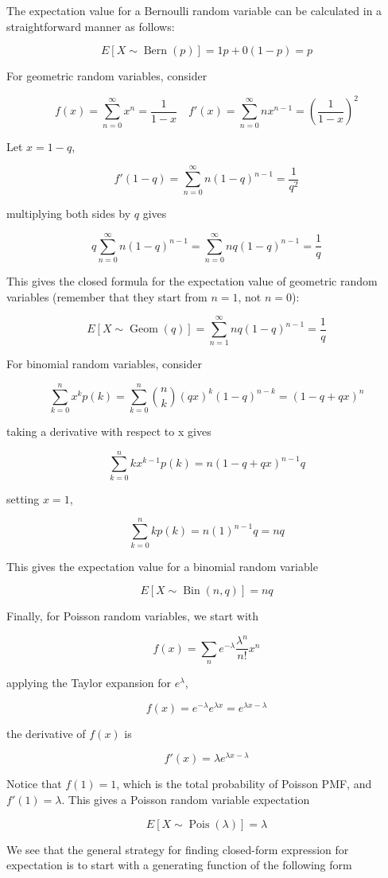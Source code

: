 \documentclass[12pt, a4paper]{article}
\newcommand{\Bern}{\operatorname{Bern}}
\newcommand{\Geom}{\operatorname{Geom}}
\newcommand{\Pois}{\operatorname{Pois}}
\newcommand{\Bin}{\operatorname{Bin}}
\begin{document}
The expectation value for a Bernoulli random variable can be calculated in a straightforward manner as follows:

$$E[X\sim\Bern(p)]=1p+0(1-p)=p$$

For geometric random variables, consider

$$f(x)=\sum_{n=0}^\infty x^n = \frac{1}{{1-x}} \quad f'(x)=\sum_{n=0}^\infty nx^{n-1} = \left(\frac{1}{{1-x}}\right)^2$$

Let $x=1-q$,

$$f'(1-q)=\sum_{n=0}^\infty n(1-q)^{n-1} = \frac{1}{q^2}$$

multiplying both sides by $q$ gives

$$q\sum_{n=0}^\infty n(1-q)^{n-1} = \sum_{n=0}^\infty nq(1-q)^{n-1} = \frac{1}{q}$$

This gives the closed formula for the expectation value of geometric random variables (remember that they start from $n=1$, not $n=0$):

$$E[X\sim\Geom(q)]=\sum_{n=1}^\infty nq(1-q)^{n-1}=\frac1q$$

For binomial random variables, consider

$$\sum_{k=0}^n x^k p(k) = \sum_{k=0}^n {n \choose k} (qx)^k (1-q)^{n-k}=(1-q+qx)^n$$

taking a derivative with respect to x gives

$$\sum_{k=0}^n kx^{k-1} p(k) =n(1-q+qx)^{n-1}q$$

setting $x=1$,

$$\sum_{k=0}^n k p(k) =n(1)^{n-1}q=nq$$

This gives the expectation value for a binomial random variable

$$E[X\sim\Bin(n,q)]=nq$$

Finally, for Poisson random variables, we start with

$$f(x)=\sum_n e^{-\lambda} \frac{\lambda^n}{n!}x^n$$

applying the Taylor expansion for $e^\lambda$,

$$f(x)=e^{-\lambda}e^{\lambda x}=e^{\lambda x-\lambda}$$

the derivative of $f(x)$ is

$$f'(x)=\lambda e^{\lambda x-\lambda}$$

Notice that $f(1)=1$, which is the total probability of Poisson PMF, and $f'(1)=\lambda$. This gives a Poisson random variable expectation

$$E[X\sim\Pois(\lambda)]=\lambda$$

We see that the general strategy for finding closed-form expression for expectation is to start with a generating function of the following form
\end{document}
